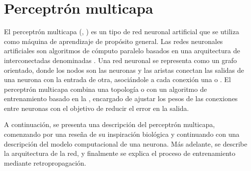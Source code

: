 %
%
%
\section{Perceptrón multicapa}
%
El perceptrón multicapa (, )
\cite{mlp2,mlp1} es un tipo de red neuronal artificial que se utiliza
como máquina de aprendizaje de propósito general.
Las redes neuronales artificiales son algoritmos de cómputo paralelo
basados en una arquitectura de  interconectadas
denominadas .
Una red neuronal se representa como un grafo orientado, donde los
nodos son las neuronas y las aristas conectan las salidas de una
neurona con la entrada de otra, asociándole a cada conexión una
 o .
El perceptrón multicapa combina una topología  o  con un algoritmo de entrenamiento basado
en la , encargado de ajustar los pesos de las
conexiones entre neuronas con el objetivo de reducir el error en la
salida.

A continuación, se presenta una descripción del perceptrón multicapa,
comenzando por una reseña de su inspiración biológica y continuando
con una descripción del modelo computacional de una neurona.
Más adelante, se describe la arquitectura de la red, y finalmente se
explica el proceso de entrenamiento mediante retropropagación.
